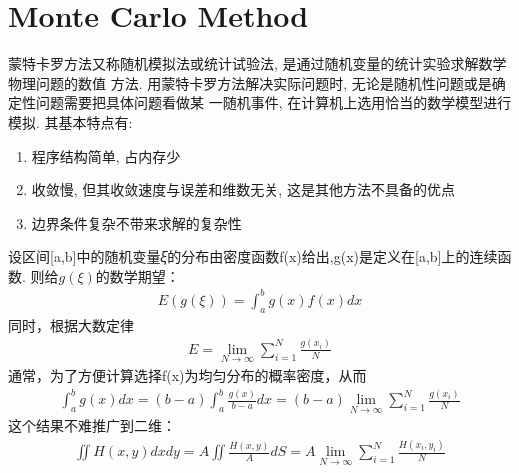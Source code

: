\section{Monte Carlo Method}
蒙特卡罗方法又称随机模拟法或统计试验法, 是通过随机变量的统计实验求解数学物理问题的数值
方法. 用蒙特卡罗方法解决实际问题时, 无论是随机性问题或是确定性问题需要把具体问题看做某
一随机事件, 在计算机上选用恰当的数学模型进行模拟. 其基本特点有:
\begin{enumerate}
    \item 程序结构简单, 占内存少
    \item 收敛慢, 但其收敛速度与误差和维数无关, 这是其他方法不具备的优点
    \item 边界条件复杂不带来求解的复杂性
\end{enumerate}
设区间[a,b]中的随机变量𝜉的分布由密度函数f(x)给出,g(x)是定义在[a,b]上的连续函数. 则给$g(\xi)$的数学期望：
\begin{align}
    E(g(\xi))=\int_a^b g(x)f(x)dx
\end{align}
同时，根据大数定律
\begin{align}
    E=\lim_{N\rightarrow \infty}\sum_{i=1}^{N}\frac{g(x_i)}{N}
\end{align}
通常，为了方便计算选择f(x)为均匀分布的概率密度，从而
\begin{align}
    \int_{a}^{b} g(x)dx=(b-a)\int_a^b \frac{g(x)}{b-a}dx=(b-a)\lim_{N\rightarrow \infty}\sum_{i=1}^{N}\frac{g(x_i)}{N}
\end{align}
这个结果不难推广到二维：
\begin{align}
    \iint H(x,y)dxdy=A\iint \frac{H(x,y)}{A}dS=A\lim_{N\rightarrow \infty}\sum_{i=1}^{N}\frac{H(x_i,y_i)}{N}
\end{align}
\newpage
